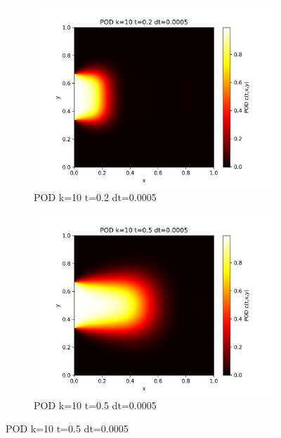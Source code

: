 \documentclass[11pt,a4 paper,one side]{article}
\begin{document}
\begin{figure}[htbp]
    \centering
    \begin{subfigure}{0.45\textwidth}
        \includegraphics[width=\textwidth]{POD k=10 t=0.2 dt=0.0005.png}
        \caption{POD k=10 t=0.2 dt=0.0005}
        \label{POD k=10 t=0.2 dt=0.0005}
    \end{subfigure}
    \hfill
    \begin{subfigure}{0.45\textwidth}
        \includegraphics[width=\textwidth]{POD k=10 t=0.5 dt=0.0005.png}
        \caption{POD k=10 t=0.5 dt=0.0005}
        \label{POD k=10 t=0.5 dt=0.0005}
    \end{subfigure}
    

\end{figure}
\end{document}
